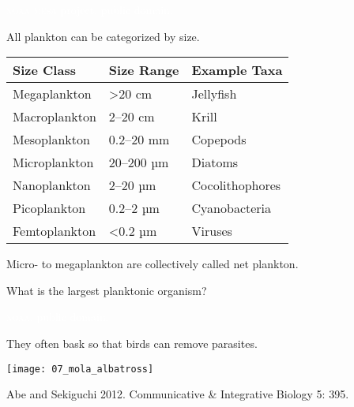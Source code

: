 \documentclass[t,handout]{beamer}  %
\begin{document}

{
\begin{frame}[b]

	\hfill \tiny \textcolor{white}{\textsc{noaa mesa} project, public domain.}
\end{frame}
}
%
\begin{frame}[t]{All plankton can be categorized by size.}

	\begin{center}
	\begin{tabular}{@{}lll@{}}
	
	\toprule
	Size Class & Size Range	& Example Taxa \\
	\midrule
	Megaplankton 	& 	\textgreater20 cm	& Jellyfish \\
	Macroplankton 	&	2–20	cm		& Krill\\
	Mesoplankton	&	0.2–20 mm	& Copepods \\
	Microplankton	&	20–200 µm	& Diatoms \\
	Nanoplankton	&	2–20 µm		& Cocolithophores \\
	Picoplankton	&	0.2–2 µm		& Cyanobacteria \\
	Femtoplankton	&	\textless0.2 µm	& Viruses \\
	\bottomrule
	\end{tabular}
	\end{center}
	
	\hangpara Micro- to megaplankton are collectively called net plankton.
	
	\pause \hangpara {} What is the largest planktonic organism?
	
\end{frame}
%

{
\begin{frame}[b]

	\hfill \tiny \textcolor{white}{\textsc{noaa}, public domain.}
\end{frame}
}
%
\begin{frame}[t]{They often bask so that birds can remove parasites.}

	\centering\texttt{[image: 07\_mola\_albatross]}

	\vfilll
	
	\hfill \tiny Abe and Sekiguchi 2012. Communicative \& Integrative Biology 5: 395.
\end{frame}
\end{document}

